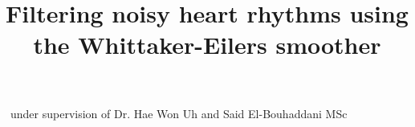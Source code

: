 \documentclass[twocolumn]{bmcart}%
\begin{document}
\begin{frontmatter}

\begin{fmbox}


\title{Filtering noisy heart rhythms using the Whittaker-Eilers smoother}


\author[
   email={g.ferdinands@students.uu.nl}   %
]{ }
\ under supervision of Dr. Hae Won Uh and Said El-Bouhaddani MSc



\end{fmbox}%



\end{frontmatter}
\end{document}
